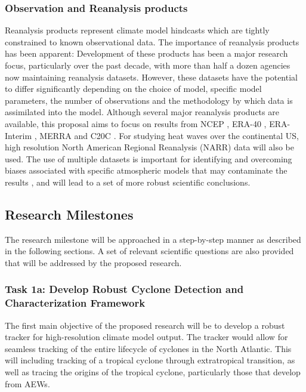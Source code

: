 \documentclass[11pt]{article}
\begin{document}
\subsubsection{Observation and Reanalysis products}

Reanalysis products represent climate model hindcasts which are tightly constrained to known observational data.  The importance of reanalysis products has been apparent:  Development of these products has been a major research focus, particularly over the past decade, with more than half a dozen agencies now maintaining reanalysis datasets.  However, these datasets have the potential to differ significantly depending on the choice of model, specific model parameters, the number of observations and the methodology by which data is assimilated into the model.  Although several major reanalysis products are available, this proposal aims to focus on results from NCEP \citep{kalnay1996ncep}, ERA-40 \citep{uppala2005era}, ERA-Interim \citep{simmons2007era}, MERRA \citep{rienecker2011merra} and C20C \citep{compo2011twentieth}.  For studying heat waves over the continental US, high resolution North American Regional Reanalysis (NARR) data will also be used.  The use of multiple datasets is important for identifying and overcoming biases associated with specific atmospheric models that may contaminate the results \citep{jun2008spatial}, and will lead to a set of more robust scientific conclusions.

\subsection{Research Milestones} \label{sec:ResearchMilestones}

The research milestone will be approached in a step-by-step manner as described in the following sections. A set of relevant scientific questions are also provided that will be addressed by the proposed research.

\subsubsection{Task 1a: Develop Robust Cyclone Detection and Characterization Framework}

The first main objective of the proposed research will be to develop a robust tracker for high-resolution climate model output. The tracker would allow for seamless tracking of the entire lifecycle of cyclones in the North Atlantic. This will including tracking of a tropical cyclone through extratropical transition, as well as tracing the origins of the tropical cyclone, particularly those that develop from AEWs. 
\end{document}
